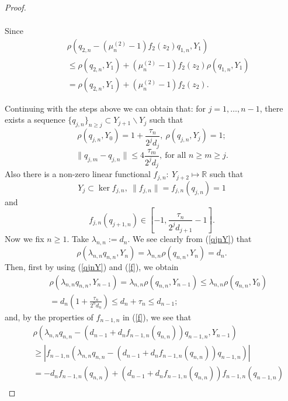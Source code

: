 \documentclass[12pt, reqno]{amsart}
\theoremstyle{definition}
\theoremstyle{remark}
\numberwithin{equation}{section}
\begin{document}
\begin{proof}
\begin{itemize}
\begin{enumerate}
\begin{eqnarray*}
\end{eqnarray*}
Since
\begin{eqnarray*}
&&\rho\left(q_{2,n}-(\mu_n^{(2)}-1)f_2(z_2)q_{1,n},Y_1\right)
\\
&&\le \rho\left(q_{2,n},Y_1\right)+(\mu_n^{(2)}-1)f_2(z_2)\rho\left(q_{1,n},Y_1\right)\\
&&=\rho\left(q_{2,n},Y_1\right)+(\mu_n^{(2)}-1)f_2(z_2).
\end{eqnarray*}
\end{enumerate}
\end{itemize}
Continuing with  the steps above we can obtain that:
for $j=1,\ldots,n-1$, there exists a sequence $\{q_{j,n}\}_{n\ge j}\subset Y_{j+1}\backslash Y_j$ such that
\begin{equation}
\label{qjnY}
\rho(q_{j,n},Y_{0})=1+\frac{\tau_n}{2^jd_j},~\rho(q_{j,n},Y_j)=1;
\end{equation}
\begin{equation}
\label{diffq}
\|q_{j,m}-q_{j,n}\|\le 4\frac{\tau_m}{2^jd_j},~\mbox{for all $n\ge m\ge j$}.
\end{equation}
Also there is a non-zero linear functional $f_{j,n}:~Y_{j+2}\longmapsto\mathbb R$ such that
$$
Y_j\subset \ker f_{j,n},~\|f_{j,n}\|=f_{j,n}(q_{j,n})=1
$$
and
\begin{equation}
\label{f}
f_{j,n}(q_{j+1,n})\in\left[-1,\frac{\tau_n}{2^{j}d_{j+1}}-1\right].
\end{equation}
Now we fix $n\ge1$. Take $\lambda_{n,n}:=d_n$. We see clearly from (\ref{qjnY}) that
\begin{equation}
\label{identqn}
\rho(\lambda_{n,n}q_{n,n},Y_n)=\lambda_{n,n}\rho(q_{n,n},Y_n)=d_n.
\end{equation}
 Then, first by using (\ref{qjnY}) and (\ref{f}), we obtain
\begin{eqnarray}
\label{upperqn}
&&\rho(\lambda_{n,n}q_{n,n},Y_{n-1})=\lambda_{n,n}\rho(q_{n,n},Y_{n-1})\le \lambda_{n,n}\rho(q_{n,n},Y_0)\nonumber\\
&&=d_n\left(1+\frac{\tau_n}{2^nd_n}\right)\le  d_n+\tau_n\le d_{n-1};
\end{eqnarray}
and, by the properties of $f_{n-1,n}$ in (\ref{f}), we see that
\begin{eqnarray}
\label{lowerqn}
&&\rho(\lambda_{n,n}q_{n,n}-(d_{n-1}+d_nf_{n-1,n}(q_{n,n}))q_{n-1,n},Y_{n-1})\nonumber\\
&&\ge |f_{n-1,n}(\lambda_{n,n}q_{n,n}-(d_{n-1}+d_nf_{n-1,n}(q_{n,n}))q_{n-1,n})|\nonumber\\
&&= -d_nf_{n-1,n}(q_{n,n})+(d_{n-1}+d_nf_{n-1,n}(q_{n,n}))f_{n-1,n}(q_{n-1,n})\nonumber\\

\end{eqnarray}
\end{proof}
\end{document}
